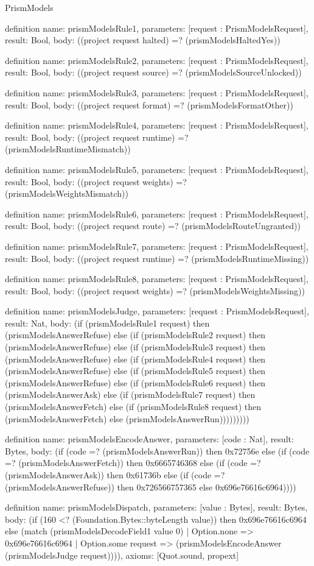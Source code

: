 \begin{lexlean}{PrismModels}
\begin{semanticmodule}
definition{
  name: prismModelsRule1,
  parameters: [request : PrismModelsRequest],
  result: Bool,
  body: ((project request halted) =? (prismModelsHaltedYes))
}

definition{
  name: prismModelsRule2,
  parameters: [request : PrismModelsRequest],
  result: Bool,
  body: ((project request source) =? (prismModelsSourceUnlocked))
}

definition{
  name: prismModelsRule3,
  parameters: [request : PrismModelsRequest],
  result: Bool,
  body: ((project request format) =? (prismModelsFormatOther))
}

definition{
  name: prismModelsRule4,
  parameters: [request : PrismModelsRequest],
  result: Bool,
  body: ((project request runtime) =? (prismModelsRuntimeMismatch))
}

definition{
  name: prismModelsRule5,
  parameters: [request : PrismModelsRequest],
  result: Bool,
  body: ((project request weights) =? (prismModelsWeightsMismatch))
}

definition{
  name: prismModelsRule6,
  parameters: [request : PrismModelsRequest],
  result: Bool,
  body: ((project request route) =? (prismModelsRouteUngranted))
}

definition{
  name: prismModelsRule7,
  parameters: [request : PrismModelsRequest],
  result: Bool,
  body: ((project request runtime) =? (prismModelsRuntimeMissing))
}

definition{
  name: prismModelsRule8,
  parameters: [request : PrismModelsRequest],
  result: Bool,
  body: ((project request weights) =? (prismModelsWeightsMissing))
}

definition{
  name: prismModelsJudge,
  parameters: [request : PrismModelsRequest],
  result: Nat,
  body: (if (prismModelsRule1 request) then (prismModelsAnswerRefuse) else (if (prismModelsRule2 request) then (prismModelsAnswerRefuse) else (if (prismModelsRule3 request) then (prismModelsAnswerRefuse) else (if (prismModelsRule4 request) then (prismModelsAnswerRefuse) else (if (prismModelsRule5 request) then (prismModelsAnswerRefuse) else (if (prismModelsRule6 request) then (prismModelsAnswerAsk) else (if (prismModelsRule7 request) then (prismModelsAnswerFetch) else (if (prismModelsRule8 request) then (prismModelsAnswerFetch) else (prismModelsAnswerRun)))))))))
}

definition{
  name: prismModelsEncodeAnswer,
  parameters: [code : Nat],
  result: Bytes,
  body: (if (code =? (prismModelsAnswerRun)) then 0x72756e else (if (code =? (prismModelsAnswerFetch)) then 0x6665746368 else (if (code =? (prismModelsAnswerAsk)) then 0x61736b else (if (code =? (prismModelsAnswerRefuse)) then 0x726566757365 else 0x696e76616c6964))))
}

definition{
  name: prismModelsDispatch,
  parameters: [value : Bytes],
  result: Bytes,
  body: (if (160 <? (Foundation.Bytes::byteLength value)) then 0x696e76616c6964 else (match (prismModelsDecodeField1 value 0)
    | Option.none => 0x696e76616c6964
    | Option.some request => (prismModelsEncodeAnswer (prismModelsJudge request)))),
  axioms: [Quot.sound, propext]
}
\end{semanticmodule}
\end{lexlean}
